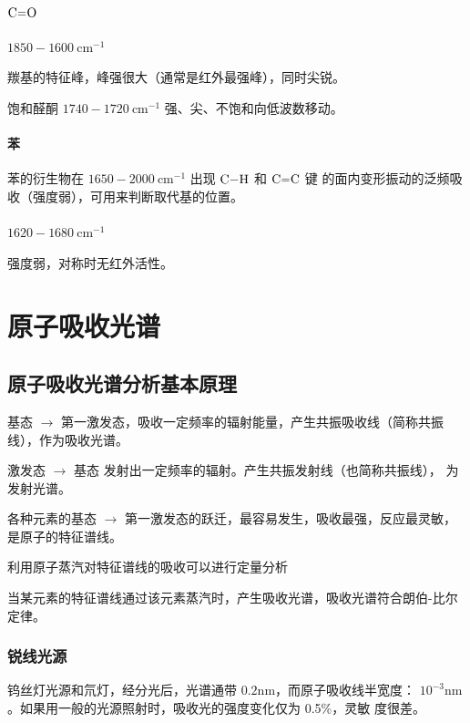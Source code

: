 \paragraph{$\ce{C=O}$} $1850 - 1600 \ \mathrm{cm}^{-1}$

羰基的特征峰，峰强很大（通常是红外最强峰），同时尖锐。

饱和醛酮 $1740 - 1720 \ \mathrm{cm}^{-1}$ 强、尖、不饱和向低波数移动。

\paragraph{苯}

苯的衍生物在 $1650 - 2000 \ \mathrm{cm}^{-1}$ 出现 $\ce{C-H}$ 和 $\ce{C=C}$ 键
的面内变形振动的泛频吸收（强度弱），可用来判断取代基的位置。


\paragraph{} $1620 - 1680 \ \mathrm{cm}^{-1}$

强度弱，对称时无红外活性。


\section{原子吸收光谱}

\subsection{原子吸收光谱分析基本原理}

基态 $\rightarrow$ 第一激发态，吸收一定频率的辐射能量，产生共振吸收线（简称共振
线），作为吸收光谱。

激发态 $\rightarrow$ 基态 发射出一定频率的辐射。产生共振发射线（也简称共振线），
为发射光谱。

各种元素的基态 $\rightarrow$ 第一激发态的跃迁，最容易发生，吸收最强，反应最灵敏，
是原子的特征谱线。

利用原子蒸汽对特征谱线的吸收可以进行定量分析

当某元素的特征谱线通过该元素蒸汽时，产生吸收光谱，吸收光谱符合朗伯-比尔定律。


\subsubsection{锐线光源}

钨丝灯光源和氘灯，经分光后，光谱通带 $0.2 \mathrm{nm}$，而原子吸收线半宽度：
$10^{-3} \mathrm{nm}$。如果用一般的光源照射时，吸收光的强度变化仅为 0.5\%，灵敏
度很差。

